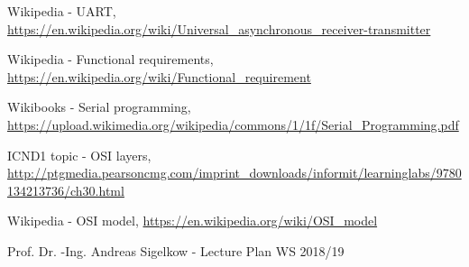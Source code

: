 \documentclass[a4paper, twoside]{report}
\begin{document}
\begin{thebibliography}{1}

\begin{flushleft}
Wikipedia - UART, \url{https://en.wikipedia.org/wiki/Universal_asynchronous_receiver-transmitter}
\end{flushleft} 

\begin{flushleft}
Wikipedia - Functional requirements, \url{https://en.wikipedia.org/wiki/Functional_requirement}
\end{flushleft}

\begin{flushleft}
Wikibooks - Serial programming, \newline \url{https://upload.wikimedia.org/wikipedia/commons/1/1f/Serial_Programming.pdf}
\end{flushleft}

\begin{flushleft}
ICND1 topic - OSI layers, \url{http://ptgmedia.pearsoncmg.com/imprint_downloads/informit/learninglabs/9780134213736/ch30.html}
\end{flushleft}

\begin{flushleft}
Wikipedia - OSI model, \url{https://en.wikipedia.org/wiki/OSI_model}
\end{flushleft}

\begin{flushleft}
Prof. Dr. -Ing. Andreas Sigelkow - Lecture Plan WS 2018/19
\end{flushleft}  
\end{thebibliography}
\end{document}
